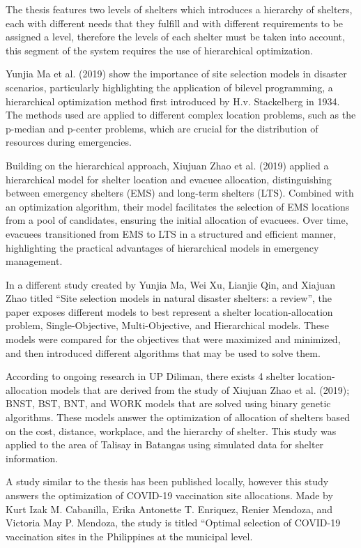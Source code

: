 	The thesis features two levels of shelters which introduces a hierarchy of shelters, each with different needs that they fulfill and with different requirements to be assigned a level, therefore the levels of each shelter must be taken into account, this segment of the system requires the use of hierarchical optimization.
	
	Yunjia Ma et al. (2019) show the importance of site selection models in disaster scenarios, particularly highlighting the application of bilevel programming, a hierarchical optimization method first introduced by H.v. Stackelberg in 1934. The methods used are applied to different complex location problems, such as the p-median and p-center problems, which are crucial for the distribution of resources during emergencies. \parencite{Yunjia2019}
	
	Building on the hierarchical approach, Xiujuan Zhao et al. (2019) applied a hierarchical model for shelter location and evacuee allocation, distinguishing between emergency shelters (EMS) and long-term shelters (LTS). Combined with an optimization algorithm, their model facilitates the selection of EMS locations from a pool of candidates, ensuring the initial allocation of evacuees. Over time, evacuees transitioned from EMS to LTS in a structured and efficient manner, highlighting the practical advantages of hierarchical models in emergency management. \parencite{Xiujuan2019}
	
	In a different study created by Yunjia Ma, Wei Xu, Lianjie Qin, and Xiajuan Zhao titled “Site selection models in natural disaster shelters: a review”, the paper exposes different models to best represent a shelter location-allocation problem, Single-Objective, Multi-Objective, and Hierarchical models. These models were compared for the objectives that were maximized and minimized, and then introduced different algorithms that may be used to solve them. \parencite{Yunjia2019}
	
	According to ongoing research in UP Diliman, there exists 4 shelter location-allocation models that are derived from the study of Xiujuan Zhao et al. (2019); BNST, BST, BNT, and WORK models that are solved using binary genetic algorithms. These models answer the optimization of allocation of shelters based on the cost, distance, workplace, and the hierarchy of shelter. This study was applied to the area of Talisay in Batangas using simulated data for shelter information. \parencite{Xiujuan2019}
	
	A study similar to the thesis has been published locally, however this study answers the optimization of COVID-19 vaccination site allocations. Made by Kurt Izak M. Cabanilla, Erika Antonette T. Enriquez, Renier Mendoza, and Victoria May P. Mendoza, the study is titled “Optimal selection of COVID-19 vaccination sites in the Philippines at the municipal level. \parencite{Kurt2021}

